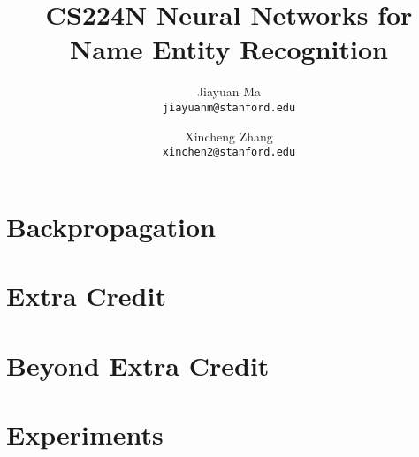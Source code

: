 \documentclass[letterpaper]{article}
\begin{document}
\title{CS224N Neural Networks for Name Entity Recognition}
\author{
        Jiayuan Ma \\
        \texttt{jiayuanm@stanford.edu}
        \and
        Xincheng Zhang\\
        \texttt{xinchen2@stanford.edu}
}
\maketitle

 
\section{Backpropagation}


\section{Extra Credit}


\section{Beyond Extra Credit} 


\section{Experiments}
 
\end{document}
